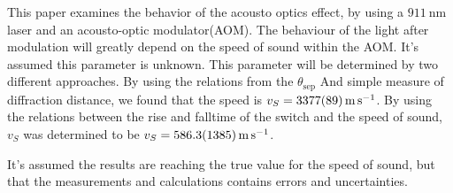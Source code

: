 \documentclass[main]{subfiles}
\begin{document}
This paper examines the behavior of the acousto optics effect, by using a $\SI{911}{\nano\meter}$ laser and an acousto-optic modulator(AOM). The behaviour of the light after modulation will greatly depend on the speed of sound within the AOM. It’s assumed this parameter is unknown. This parameter will be determined by two different approaches. By using the relations from the $\theta_{\text{sep}}$ And simple measure of diffraction distance, we found that the speed is $v_S = \SI{3377 \pm 89}{\meter\per\second}$. By using the relations between the rise and falltime of the switch and the speed of sound, $v_S$ was determined to be $v_S =\SI{586,3\pm 138,5}{\meter\per\second}$.

 It’s assumed the results are reaching the true value for the speed of sound, but that the measurements and calculations contains errors and uncertainties.
\end{document}
